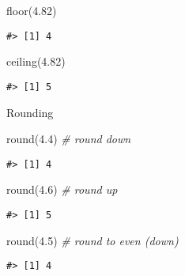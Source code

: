 \documentclass[
]{book}
\newenvironment{Shaded}{\begin{snugshade}}{\end{snugshade}}
\newcommand{\CommentTok}[1]{\textcolor[rgb]{0.56,0.35,0.01}{\textit{#1}}}
\newcommand{\FloatTok}[1]{\textcolor[rgb]{0.00,0.00,0.81}{#1}}
\newcommand{\FunctionTok}[1]{\textcolor[rgb]{0.00,0.00,0.00}{#1}}
\newcommand{\NormalTok}[1]{#1}
\begin{document}
\begin{Shaded}
\begin{Highlighting}[]
\FunctionTok{floor}\NormalTok{(}\FloatTok{4.82}\NormalTok{)}
\end{Highlighting}
\end{Shaded}

\begin{verbatim}
#> [1] 4
\end{verbatim}

\begin{Shaded}
\begin{Highlighting}[]
\FunctionTok{ceiling}\NormalTok{(}\FloatTok{4.82}\NormalTok{)}
\end{Highlighting}
\end{Shaded}

\begin{verbatim}
#> [1] 5
\end{verbatim}

Rounding

\begin{Shaded}
\begin{Highlighting}[]
\FunctionTok{round}\NormalTok{(}\FloatTok{4.4}\NormalTok{) }\CommentTok{\# round down}
\end{Highlighting}
\end{Shaded}

\begin{verbatim}
#> [1] 4
\end{verbatim}

\begin{Shaded}
\begin{Highlighting}[]
\FunctionTok{round}\NormalTok{(}\FloatTok{4.6}\NormalTok{) }\CommentTok{\# round up}
\end{Highlighting}
\end{Shaded}

\begin{verbatim}
#> [1] 5
\end{verbatim}

\begin{Shaded}
\begin{Highlighting}[]
\FunctionTok{round}\NormalTok{(}\FloatTok{4.5}\NormalTok{) }\CommentTok{\# round to even (down)}
\end{Highlighting}
\end{Shaded}

\begin{verbatim}
#> [1] 4
\end{verbatim}
\end{document}
